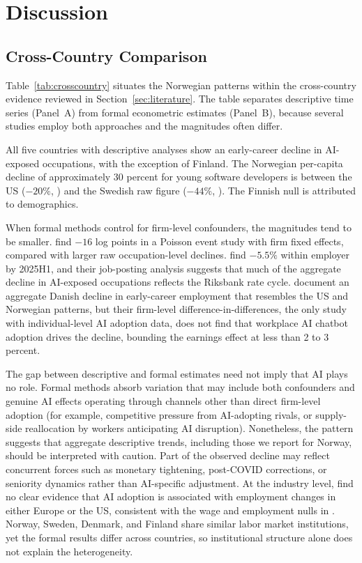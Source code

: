 \section{Discussion}\label{sec:discussion}

\subsection{Cross-Country Comparison}\label{sec:discussion:crosscountry}

Table~\ref{tab:crosscountry} situates the Norwegian patterns within the cross-country evidence reviewed in Section~\ref{sec:literature}. The table separates descriptive time series (Panel~A) from formal econometric estimates (Panel~B), because several studies employ both approaches and the magnitudes often differ.

All five countries with descriptive analyses show an early-career decline in AI-exposed occupations, with the exception of Finland. The Norwegian per-capita decline of approximately 30 percent for young software developers is between the US ($-20\%$, \citealp{brynjolfsson2025}) and the Swedish raw figure ($-44\%$, \citealp{lodefalk2026}). The Finnish null \citep{kauhanen2026} is attributed to demographics.

When formal methods control for firm-level confounders, the magnitudes tend to be smaller. \citet{brynjolfsson2025} find $-16$ log points in a Poisson event study with firm fixed effects, compared with larger raw occupation-level declines. \citet{lodefalk2026} find $-5.5\%$ within employer by 2025H1, and their job-posting analysis suggests that much of the aggregate decline in AI-exposed occupations reflects the Riksbank rate cycle. \citet{humlum2026} document an aggregate Danish decline in early-career employment that resembles the US and Norwegian patterns, but their firm-level difference-in-differences, the only study with individual-level AI adoption data, does not find that workplace AI chatbot adoption drives the decline, bounding the earnings effect at less than 2 to 3 percent.

The gap between descriptive and formal estimates need not imply that AI plays no role. Formal methods absorb variation that may include both confounders and genuine AI effects operating through channels other than direct firm-level adoption (for example, competitive pressure from AI-adopting rivals, or supply-side reallocation by workers anticipating AI disruption). Nonetheless, the pattern suggests that aggregate descriptive trends, including those we report for Norway, should be interpreted with caution. Part of the observed decline may reflect concurrent forces such as monetary tightening, post-COVID corrections, or seniority dynamics rather than AI-specific adjustment. At the industry level, \citet{bick2026} find no clear evidence that AI adoption is associated with employment changes in either Europe or the US, consistent with the wage and employment nulls in \citet{humlum2026}. Norway, Sweden, Denmark, and Finland share similar labor market institutions, yet the formal results differ across countries, so institutional structure alone does not explain the heterogeneity.

